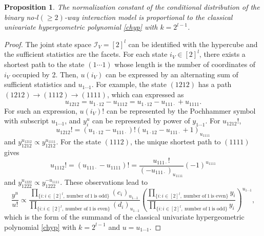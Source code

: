 \documentclass[10pt,a4paper]{amsart}
\newtheorem{proposition}{Proposition}
\begin{document}
\begin{proposition}\label{prop:no-l-way}
  The normalization constant of the conditional distribution
  of the binary no-$l(\ge 2)$-way interaction model is
  proportional to the classical univariate hypergeometric
  polynomial \eqref{chyp} with $k=2^{l-1}$.
\end{proposition}  

\begin{proof}
  The joint state space $\mathcal{I}_V=[2]^l$ can be identified
  with the hypercube and the sufficient statistics are the facets.
  For each state $i_V\in[2]^l$, there exists a shortest path to
  the state $(1\cdots 1)$ whose length is the number of coordinates
  of $i_V$ occupied by 2. Then, $u(i_V)$ can be expressed by
  an alternating sum of sufficient statistics and $u_{1\cdots 1}$.
  For example, the state $(1212)$ has a path
  $(1212)\to(1112)\to(1111)$, which can expressed as
  \[
    u_{1212}=u_{1\cdot12}-u_{1112}=u_{1\cdot12}-u_{111\cdot}
    +u_{1111}.
  \]
  For such an expression, $u(i_V)!$ can be represented by
  the Pochhammer symbol with subscript $u_{1\cdots 1}$, and
  $y_{i}^{u}$ can be represented by power of $y_{1\cdots1}$.
  For $u_{1212}!$,
  \[
    u_{1212}!
    =(u_{1\cdot12}-u_{111\cdot})!
    (u_{1\cdot12}-u_{111\cdot}+1)_{u_{1111}}
  \]
  and $y_{1212}^{u_{1212}}\propto y_{1212}^{u_{1111}}$.
  For the state $(1112)$, the unique shortest path to $(1111)$ gives
  \[
    u_{1112}!=(u_{111\cdot}-u_{1111})!=\frac{u_{111\cdot}!}
    {(-u_{111\cdot})_{u_{1111}}}(-1)^{u_{1111}}
  \]
  and $y_{1222}^{u_{1222}}\propto y_{1222}^{-u_{1111}}$.
  These observations lead to 
  \begin{equation}
    \frac{y^u}{u!}\propto
    \frac{\prod_{\{i:i\in[2]^l,~\text{number~of}~1~\text{is~odd}\}}
    (c_i)_{u_{1\cdots1}}}
    {\prod_{\{i:i\in[2]^l,~\text{number~of}~1~\text{is~even}\}}
    (d_i)_{u_{1\cdots1}}}
    \left(
    \frac{
    \prod_{\{i:i\in[2]^l,~\text{number~of}~1~\text{is~even}\}}y_i}
    {\prod_{\{i:i\in[2]^l,~\text{number~of}~1~\text{is~odd}\}}y_i}
    \right)^{u_{1\cdots1}},
    \label{toric2n}     
  \end{equation}
  which is the form of the summand of the classical univariate
  hypergeometric polynomial \eqref{chyp} with $k=2^{l-1}$ and
  $u=u_{1\cdots1}$. 
\end{proof}
\end{document}
